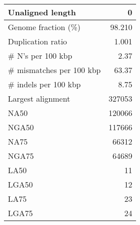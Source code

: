 \documentclass[12pt,a4paper]{article}
\begin{document}
\begin{table}[ht]
\begin{center}
\begin{tabular}{|l*{1}{|r}|}
Unaligned length & 0 \\ \hline
Genome fraction (\%) & 98.210 \\ \hline
Duplication ratio & 1.001 \\ \hline
\# N's per 100 kbp & 2.37 \\ \hline
\# mismatches per 100 kbp & 63.37 \\ \hline
\# indels per 100 kbp & 8.75 \\ \hline
Largest alignment & 327053 \\ \hline
NA50 & 120066 \\ \hline
NGA50 & 117666 \\ \hline
NA75 & 66312 \\ \hline
NGA75 & 64689 \\ \hline
LA50 & 11 \\ \hline
LGA50 & 12 \\ \hline
LA75 & 23 \\ \hline
LGA75 & 24 \\ \hline
\end{tabular}
\end{center}
\end{table}
\end{document}
